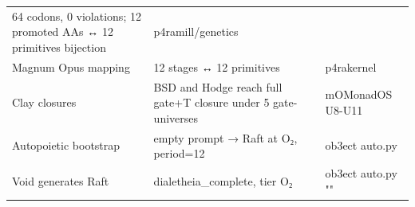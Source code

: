 \begin{longtable}[]{@{}lll@{}}
\begin{minipage}[t]{0.28\columnwidth}
64 codons, 0 violations; 12 promoted AAs ↔ 12 primitives bijection\strut
\end{minipage} & \begin{minipage}[t]{0.32\columnwidth}\raggedright
p4ramill/genetics\strut
\end{minipage}\tabularnewline
\begin{minipage}[t]{0.32\columnwidth}\raggedright
Magnum Opus mapping\strut
\end{minipage} & \begin{minipage}[t]{0.28\columnwidth}\raggedright
12 stages ↔ 12 primitives\strut
\end{minipage} & \begin{minipage}[t]{0.32\columnwidth}\raggedright
p4rakernel\strut
\end{minipage}\tabularnewline
\begin{minipage}[t]{0.32\columnwidth}\raggedright
Clay closures\strut
\end{minipage} & \begin{minipage}[t]{0.28\columnwidth}\raggedright
BSD and Hodge reach full gate+T closure under 5 gate-universes\strut
\end{minipage} & \begin{minipage}[t]{0.32\columnwidth}\raggedright
mOMonadOS U8-U11\strut
\end{minipage}\tabularnewline
\begin{minipage}[t]{0.32\columnwidth}\raggedright
Autopoietic bootstrap\strut
\end{minipage} & \begin{minipage}[t]{0.28\columnwidth}\raggedright
empty prompt → Raft at O₂, period=12\strut
\end{minipage} & \begin{minipage}[t]{0.32\columnwidth}\raggedright
ob3ect auto.py\strut
\end{minipage}\tabularnewline
\begin{minipage}[t]{0.32\columnwidth}\raggedright
Void generates Raft\strut
\end{minipage} & \begin{minipage}[t]{0.28\columnwidth}\raggedright
dialetheia\_complete, tier O₂\strut
\end{minipage} & \begin{minipage}[t]{0.32\columnwidth}\raggedright
ob3ect auto.py ""\strut
\end{minipage}\tabularnewline
\bottomrule
\end{longtable}

